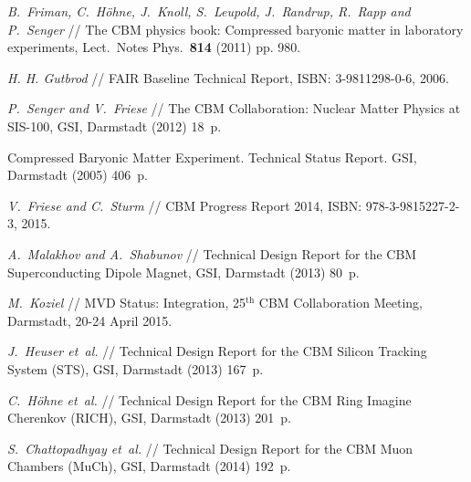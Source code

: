 \begin{thebibliography}{99}


\textit{B.~Friman, C.~H\"{o}hne, J.~Knoll, S.~Leupold, J.~Randrup, R.~Rapp and P.~Senger} //
The CBM physics book: Compressed baryonic matter in laboratory experiments,
Lect.\ Notes Phys.\ {\bf 814} (2011) pp. 980.

\textit{H. H. Gutbrod} // %
FAIR Baseline Technical Report,
ISBN: 3-9811298-0-6, 2006.


\textit{P.~Senger and V.~Friese} //
The CBM Collaboration: Nuclear Matter Physics at SIS-100,
GSI, Darmstadt (2012) 18~p.

Compressed Baryonic Matter Experiment. Technical Status Report.
GSI, Darmstadt (2005) 406~p.

\textit{V.~Friese and C.~Sturm} // %
CBM Progress Report 2014,
ISBN: 978-3-9815227-2-3, 2015.


\textit{A.~Malakhov and A.~Shabunov} // %
Technical Design Report for the CBM Superconducting Dipole Magnet,
GSI, Darmstadt (2013) 80~p.

\textit{M.~Koziel} //
MVD Status: Integration,
25$^\mathrm{th}$ CBM Collaboration Meeting, Darmstadt, 20-24 April 2015.

\textit{J.~Heuser et~al.} //
Technical Design Report for the CBM Silicon Tracking System (STS),
 GSI, Darmstadt (2013) 167~p.

\textit{C.~H\"{o}hne et~al.} //
Technical Design Report for the CBM Ring Imagine Cherenkov (RICH),
GSI, Darmstadt (2013) 201~p.

\textit{S.~Chattopadhyay et~al.} //
Technical Design Report for the CBM Muon Chambers (MuCh),
GSI, Darmstadt (2014) 192~p.


\end{thebibliography}
